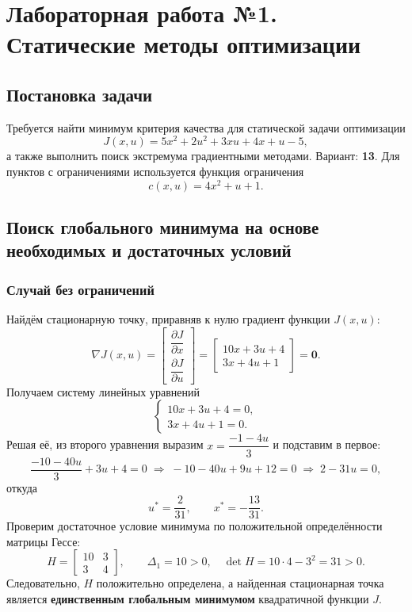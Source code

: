 \chapter{Лабораторная работа №1. Статические методы оптимизации}

\section*{Постановка задачи}
Требуется найти минимум критерия качества для статической задачи оптимизации
\[
J(x,u)=5x^2+2u^2+3xu+4x+u-5,
\]
а также выполнить поиск экстремума градиентными методами. Вариант: \textbf{13}. Для пунктов с ограничениями используется функция ограничения
\[
 c(x,u)=4x^2+u+1.
\]

\section{Поиск глобального минимума на основе необходимых и достаточных условий}
\subsection{Случай без ограничений}
Найдём стационарную точку, приравняв к нулю градиент функции \(J(x,u)\):
\[
\nabla J(x,u)=\begin{bmatrix}\dfrac{\partial J}{\partial x}\\[2mm]\dfrac{\partial J}{\partial u}\end{bmatrix}
=\begin{bmatrix}10x+3u+4\\ 3x+4u+1\end{bmatrix}=\mathbf{0}.
\]
Получаем систему линейных уравнений
\[
\begin{cases}
10x+3u+4=0,\\
3x+4u+1=0.
\end{cases}
\]
Решая её, из второго уравнения выразим \(x=\dfrac{-1-4u}{3}\) и подставим в первое:
\[
\frac{-10-40u}{3}+3u+4=0 \;\Rightarrow\; -10-40u+9u+12=0 \;\Rightarrow\; 2-31u=0,
\]
откуда
\[
 u^{\ast}=\frac{2}{31},\qquad x^{\ast}=-\frac{13}{31}.
\]
Проверим достаточное условие минимума по положительной определённости матрицы Гессе:
\[
H=\begin{bmatrix}10&3\\3&4\end{bmatrix},\qquad \Delta_1=10>0,\quad \det H=10\cdot4-3^2=31>0.
\]
Следовательно, \(H\) положительно определена, а найденная стационарная точка является \textbf{единственным глобальным минимумом} квадратичной функции \(J\).

